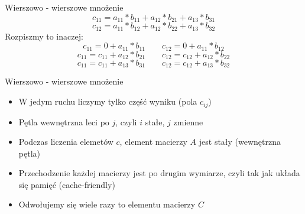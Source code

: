 \documentclass[xcolor={dvipsnames}]{beamer}
\begin{document}
\begin{frame}{Wierszowo - wierszowe mnożenie}
\LARGE
	\[  c_{11} = a_{11} * b_{11} +  a_{12} * b_{21} + a_{13} * b_{31}  \]
	\[  c_{12} = a_{11} * b_{12} +  a_{12} * b_{22} + a_{13} * b_{32}  \]
	Rozpiszmy to inaczej:
	\[  c_{11} = 0 + a_{11} * b_{11} \qquad c_{12} = 0 + a_{11} * b_{12} \]
	\[  c_{11} = c_{11} +  a_{12} * b_{21} \qquad  c_{12} = c_{12} + a_{12} * b_{22} \]
	\[  c_{11} = c_{11} +  a_{13} * b_{31} \qquad  c_{12} = c_{12} + a_{13} * b_{32} \]
\end{frame}

\begin{frame}{Wierszowo - wierszowe mnożenie}
	\Large
	\begin{block}{}
		\begin{itemize}
			\item W jedym ruchu liczymy tylko część wyniku (pola $c_{ij}$)
			\item Pętla wewnętrzna leci po $j$, czyli $i$ stałe, $j$ zmienne
			\item Podczas liczenia elemetów $c$, element macierzy $A$ jest stały (wewnętrzna pętla)
			\item Przechodzenie każdej macierzy jest po drugim wymiarze, czyli tak jak układa się pamięć (cache-friendly)
			\item Odwołujemy się wiele razy to elementu macierzy $C$
		\end{itemize}
	\end{block}
\end{frame}
\end{document}
